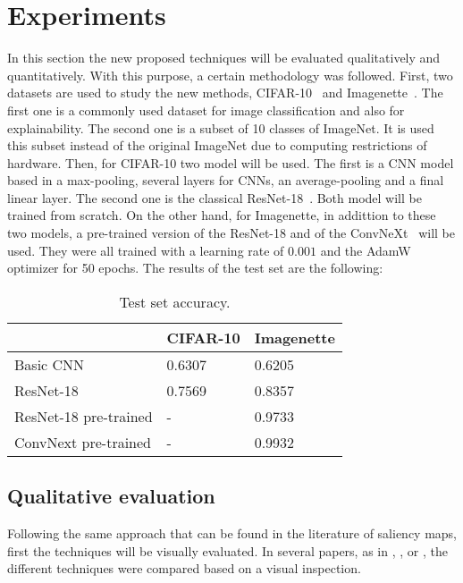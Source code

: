 \documentclass[preprint,12pt]{elsarticle}
\begin{document}
\section{Experiments}
\label{sec:experiments}
In this section the new proposed techniques will be evaluated qualitatively and quantitatively. With this purpose, a certain methodology was followed. First, two datasets are used to study the new methods, {CIFAR-10}~\cite{CIFAR10CIFAR100Datasets} and Imagenette~\cite{Imagenette2022}. The first one is a commonly used dataset for image classification and also for explainability. The second one is a subset of 10 classes of ImageNet. It is used this subset instead of the original ImageNet due to computing restrictions of hardware. Then, for CIFAR-10 two model will be used. The first is a CNN model based in a max-pooling, several layers for CNNs, an average-pooling and a final linear layer. The second one is the classical ResNet-18~\cite{heDeepResidualLearning2016}. Both model will be trained from scratch. On the other hand, for Imagenette, in addittion to these two models, a pre-trained version of the ResNet-18 and of the ConvNeXt~\cite{liuConvNet2020s2022} will be used. They were all trained with a learning rate of $0.001$ and the AdamW optimizer for 50 epochs. The results of the test set are the following:

\begin{table}[ht]
  \centering
  \small
  \caption{Test set accuracy.}
  \label{tab: training results}
  \begin{tabular}{L{6cm}C{2cm}C{2cm}}
    \toprule
    {} & CIFAR-10 & Imagenette \\
    \midrule
    Basic CNN & 0.6307 & 0.6205 \\
    ResNet-18  & 0.7569 & 0.8357 \\
    ResNet-18 pre-trained  & - & 0.9733 \\
    ConvNext pre-trained & - & 0.9932 \\
    \bottomrule
  \end{tabular}
\end{table}

\subsection{Qualitative evaluation}

Following the same approach that can be found in the literature of saliency maps, first the techniques will be visually evaluated. In several papers, as in \cite{simonyanDeepConvolutionalNetworks2014}, \cite{springenbergStrivingSimplicityAll2015a}, \cite{smilkovSmoothGradRemovingNoise} or \cite{sundararajanAxiomaticAttributionDeep2017}, the different techniques were compared based on a visual inspection. 
\end{document}
